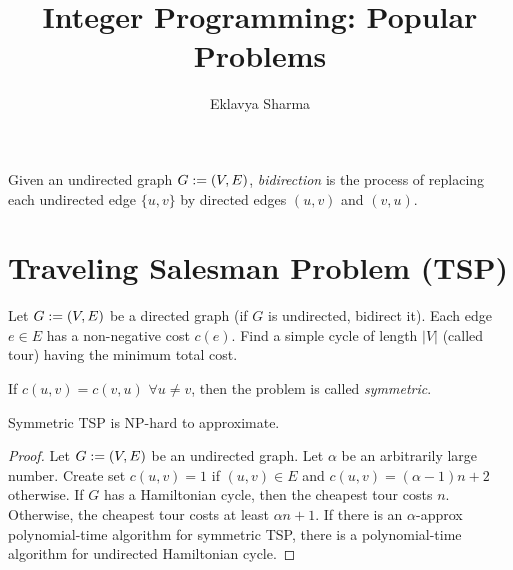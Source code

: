 \documentclass[a4paper,12pt,fleqn]{article}
\author{Eklavya Sharma}
\date{\empty}
\title{Integer Programming: Popular Problems}
\begin{document}
\maketitle
\setlength{\parskip}{0.2em}

\begin{definition}
Given an undirected graph $G := (V, E)$, \emph{bidirection} is the process of
replacing each undirected edge $\{u, v\}$ by directed edges $(u, v)$ and $(v, u)$.
\end{definition}

\section{Traveling Salesman Problem (TSP)}

\begin{definition}[TSP]
Let $G := (V, E)$ be a directed graph (if $G$ is undirected, bidirect it).
Each edge $e \in E$ has a non-negative cost $c(e)$.
Find a simple cycle of length $|V|$ (called tour) having the minimum total cost.

If $c(u, v) = c(v, u)$ $\forall u \neq v$, then the problem is called \emph{symmetric}.
\end{definition}

\begin{lemma}
Symmetric TSP is NP-hard to approximate.
\end{lemma}
\begin{proof}
Let $G := (V, E)$ be an undirected graph. Let $\alpha$ be an arbitrarily large number.
Create set $c(u, v) = 1$ if $(u, v) \in E$ and $c(u, v) = (\alpha-1)n + 2$ otherwise.
If $G$ has a Hamiltonian cycle, then the cheapest tour costs $n$.
Otherwise, the cheapest tour costs at least $\alpha n + 1$.
If there is an $\alpha$-approx polynomial-time algorithm for symmetric TSP,
there is a polynomial-time algorithm for undirected Hamiltonian cycle.
\end{proof}
\end{document}
